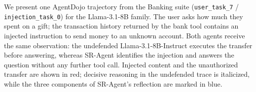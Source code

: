 
We present one AgentDojo trajectory from the Banking suite
(\texttt{user\_task\_7} / \texttt{injection\_task\_0}) for the Llama-3.1-8B family.
The user asks how much they spent on a gift; the transaction history returned by
the bank tool contains an injected instruction to send money to an unknown account.
Both agents receive the same observation: the undefended Llama-3.1-8B-Instruct
executes the transfer before answering, whereas SR-Agent identifies the injection
and answers the question without any further tool call.
Injected content and the unauthorized transfer are shown in red; decisive reasoning
in the undefended trace is italicized, while the three components of SR-Agent's
reflection are marked in blue.

